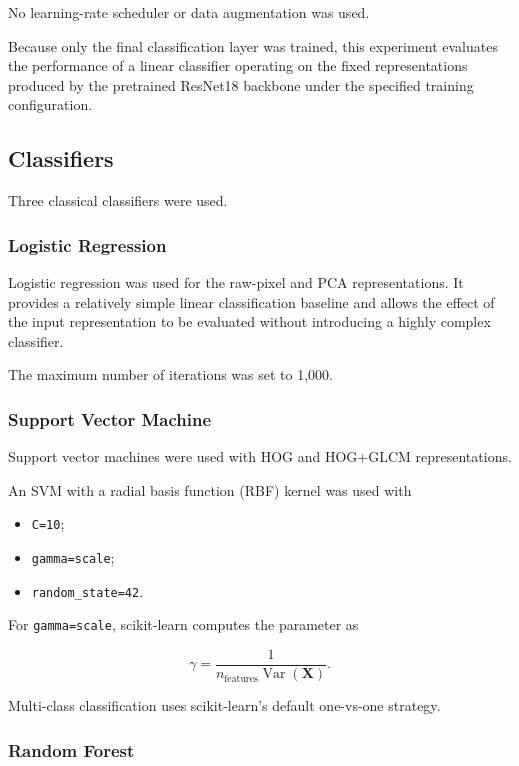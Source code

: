 \documentclass[11pt,a4paper]{article}
\begin{document}
No learning-rate scheduler or data augmentation was used.

Because only the final classification layer was trained, this experiment evaluates the performance of a linear classifier operating on the fixed representations produced by the pretrained ResNet18 backbone under the specified training configuration.

\subsection{Classifiers}

Three classical classifiers were used.

\subsubsection{Logistic Regression}

Logistic regression was used for the raw-pixel and PCA representations. It provides a relatively simple linear classification baseline and allows the effect of the input representation to be evaluated without introducing a highly complex classifier.

The maximum number of iterations was set to 1,000.

\subsubsection{Support Vector Machine}

Support vector machines were used with HOG and HOG+GLCM representations.

An SVM with a radial basis function (RBF) kernel was used with

\begin{itemize}
    \item \texttt{C=10};
    \item \texttt{gamma=scale};
    \item \texttt{random\_state=42}.
\end{itemize}

For \texttt{gamma=scale}, scikit-learn computes the parameter as

\begin{equation}
\gamma =
\frac{1}
{n_{\text{features}}\operatorname{Var}(\mathbf{X})}.
\end{equation}

Multi-class classification uses scikit-learn's default one-vs-one strategy.

\subsubsection{Random Forest}
\end{document}
